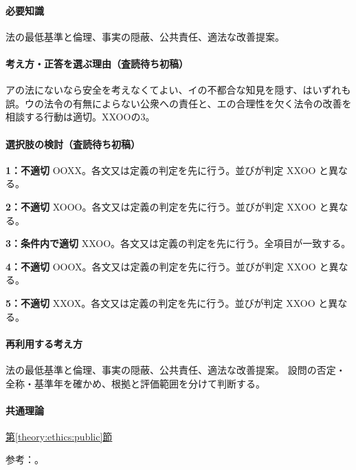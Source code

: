 \paragraph{必要知識} 法の最低基準と倫理、事実の隠蔽、公共責任、適法な改善提案。

\paragraph{考え方・正答を選ぶ理由（査読待ち初稿）} アの法にないなら安全を考えなくてよい、イの不都合な知見を隠す、はいずれも誤。ウの法令の有無によらない公衆への責任と、エの合理性を欠く法令の改善を相談する行動は適切。XXOOの3。

\paragraph{選択肢の検討（査読待ち初稿）}\mbox{}\par

\noindent\textbf{1：不適切} OOXX。各文又は定義の判定を先に行う。並びが判定 XXOO と異なる。\par

\noindent\textbf{2：不適切} XOOO。各文又は定義の判定を先に行う。並びが判定 XXOO と異なる。\par

\noindent\textbf{3：条件内で適切} XXOO。各文又は定義の判定を先に行う。全項目が一致する。\par

\noindent\textbf{4：不適切} OOOX。各文又は定義の判定を先に行う。並びが判定 XXOO と異なる。\par

\noindent\textbf{5：不適切} XXOX。各文又は定義の判定を先に行う。並びが判定 XXOO と異なる。\par

\paragraph{再利用する考え方} 法の最低基準と倫理、事実の隠蔽、公共責任、適法な改善提案。 設問の否定・全称・基準年を確かめ、根拠と評価範囲を分けて判断する。

\paragraph{共通理論} \hyperref[theory:ethics:public]{第\ref*{theory:ethics:public}節}

\par 参考：\cite{ipej_ethics2011}。

